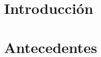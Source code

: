 \documentclass[12pt,twoside]{report}
\begin{document}
\restoregeometry
\newpage
\tableofcontents

\chapter{Introducci\'on}


\chapter{Antecedentes}




\end{document}
